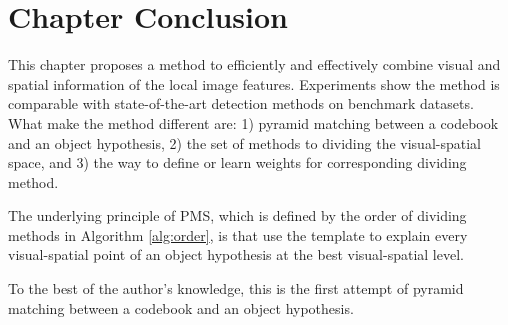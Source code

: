\documentclass[paper]{ieice}
\begin{document}
\section{Chapter Conclusion}
\label{conc5}
This chapter proposes a method to efficiently and effectively combine visual and spatial information of the local image features. Experiments show the method is comparable with state-of-the-art detection methods on benchmark datasets. What make the method different are: 1) pyramid matching between a codebook and an  object hypothesis, 2) the set of methods to dividing the visual-spatial space, and 3) the way to define or learn weights for corresponding dividing method.

The underlying principle of PMS, which is defined by the order of dividing methods in Algorithm \ref{alg:order}, is that use the template to explain every visual-spatial point of an object hypothesis at the best visual-spatial level.

To the best of the author's knowledge, this is the first attempt of pyramid matching between a codebook and an object hypothesis.






\end{document}
